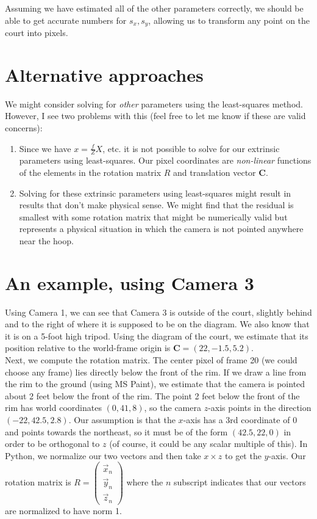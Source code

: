 \documentclass{article}
\begin{document}
Assuming we have estimated all of the other parameters correctly, we should be able to get accurate numbers for $s_x, s_y$, allowing us to transform any point on the court into pixels.

\section{Alternative approaches}
We might consider solving for \textit{other} parameters using the least-squares method. However, I see two problems with this (feel free to let me know if these are valid concerns):
\begin{enumerate}
  \item Since we have $x=\frac{f}{Z}X$, etc. it is not possible to solve for our extrinsic parameters using least-squares. Our pixel coordinates are \textit{non-linear} functions of the elements in the rotation matrix $R$ and translation vector $\bm{C}$.
  \item Solving for these extrinsic parameters using least-squares might result in results that don't make physical sense. We might find that the residual is smallest with some rotation matrix that might be numerically valid but represents a physical situation in which the camera is not pointed anywhere near the hoop.
\end{enumerate}

\section{An example, using Camera 3}
Using Camera 1, we can see that Camera 3 is outside of the court, slightly behind and to the right of where it is supposed to be on the diagram. We also know that it is on a 5-foot high tripod. Using the diagram of the court, we estimate that its position relative to the world-frame origin is $\bm{C}=(22, -1.5, 5.2)$. \\

Next, we compute the rotation matrix. The center pixel of frame 20 (we could choose any frame) lies directly below the front of the rim. If we draw a line from the rim to the ground (using MS Paint), we estimate that the camera is pointed about 2 feet below the front of the rim. The point 2 feet below the front of the rim has world coordinates $(0, 41, 8)$, so the camera $z$-axis points in the direction $(-22, 42.5, 2.8)$. Our assumption is that the $x$-axis has a 3rd coordinate of 0 and points towards the northeast, so it must be of the form $(42.5, 22, 0)$ in order to be orthogonal to $z$ (of course, it could be any scalar multiple of this). In Python, we normalize our two vectors and then take $x\times z$ to get the $y$-axis. Our rotation matrix is $R=\begin{pmatrix} \vec{x}_n \\ \vec{y}_n \\ \vec{z}_n \end{pmatrix}$ where the $n$ subscript indicates that our vectors are normalized to have norm 1. \\
\end{document}
